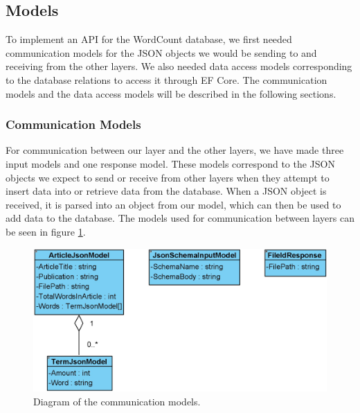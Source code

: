 \subsection{Models}\label{models}
To implement an API for the WordCount database, we first needed communication models for the JSON objects we would be sending to and receiving from the other layers. 
We also needed data access models corresponding to the database relations to access it through EF Core. 
The communication models and the data access models will be described in the following sections.

\subsubsection*{Communication Models}
For communication between our layer and the other layers, we have made three input models and one response model. 
These models correspond to the JSON objects we expect to send or receive from other layers when they attempt to insert data into or retrieve data from the database. 
When a JSON object is received, it is parsed into an object from our model, which can then be used to add data to the database. The models used for communication between layers can be seen in figure \ref*{fig:CommunicationModels}.
\\
\begin{figure}[H]
    \centering
    \includegraphics[scale=0.4]{Images/CommunicationModels.jpg}
    \caption{Diagram of the communication models.}
    \label{fig:CommunicationModels}
\end{figure}

